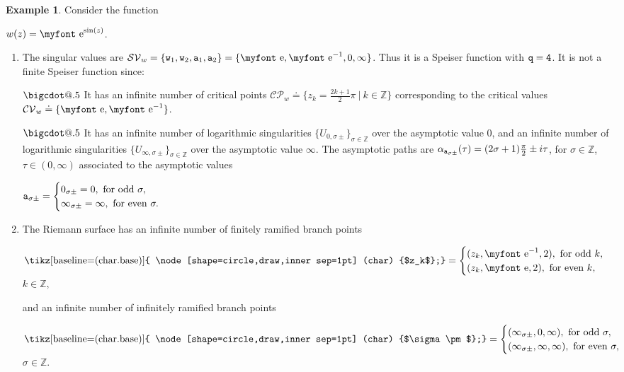\documentclass[final,3p,times]{elsarticle}
\makeatletter
\newcommand{\ZZ}{\ensuremath{{\mathbb Z}}}
\newcommand{\e}{{\text{\myfont e}}}
\newcommand{\circled}[1]{ \text{\tikz[baseline=(char.base)]{
    \node[shape=circle,draw,inner sep=1pt] (char) {$#1$};}} }
\newcommand*\bigcdot{\mathpalette\bigcdot@{.5}}
\newcommand*\bigcdot@[2]{\mathbin{\vcenter{\hbox{\scalebox{#2}{$\m@th#1\bullet$}}}}}
\theoremstyle{definition}
\newtheorem{example}{Example}[section]
\makeatother
\begin{document}
\begin{example}
\label{example:tessellation-expsin}
Consider the function 

\centerline{
$w(z)=\e^{\sin(z)}$.
}


\begin{enumerate}[label=\alph*),leftmargin=*]
\item
The singular values are 
$\mathcal{SV}_w=\{{\tt w}_1, {\tt w}_2, {\tt a}_1, {\tt a}_2 \}=\{\e, \e^{-1},0,\infty\}$.
Thus it is a Speiser function with $\tt q = 4$.
It is not a finite Speiser function since:

\noindent
$\bigcdot$ 
It has an infinite number of critical points
$\mathcal{CP}_w \doteq \{z_k = \frac{2k+1}{2}\pi \ \vert \ k\in\ZZ\}$ 
corresponding to the critical values $\mathcal{CV}_w \doteq \{\e, \e^{-1}\}$.

\noindent
$\bigcdot$
It has an infinite number of logarithmic singularities 
$\{ U_{0, \sigma \pm} \}_{\sigma \in \ZZ}$ over the asymptotic value $0$, and
an infinite number of logarithmic singularities 
$\{ U_{\infty, \sigma \pm} \}_{\sigma \in \ZZ}$ over the asymptotic value $\infty$.
%
The asymptotic paths are 
$\alpha_{{\tt a}_{\sigma \pm}}( \tau )=(2\sigma+1)\frac{\pi}{2} \pm i \tau $, 
for $\sigma\in\ZZ$, $\tau\in (0,\infty)$ associated to the asymptotic values

\centerline{
${\tt a}_{\sigma\pm}=\begin{cases}
  0_{\sigma\pm}=0, \text{ for odd }\sigma,\\
  \infty_{\sigma\pm}=\infty, \text{ for even }\sigma.
\end{cases}$
}

\item The Riemann surface has an infinite number of finitely ramified branch points

\centerline{
$\circled{z_k}= \begin{cases} (z_k, \e^{-1}, 2), \text{ for odd } k,\\
(z_k, \e, 2), \text{ for even } k, \end{cases}$ $k\in \ZZ,$
}

\noindent
and an infinite number of infinitely ramified branch points 

\centerline{
$\circled{\sigma\pm }= \begin{cases} (\infty_{\sigma\pm}, 0, \infty), \text{ for odd } \sigma,\\
(\infty_{\sigma\pm}, \infty, \infty), \text{ for even } \sigma, \end{cases}$ $\sigma \in \ZZ.$
}


\end{enumerate}
\end{example}
\end{document}
